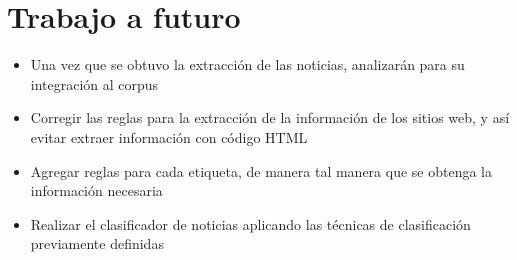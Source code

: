 
\section{Trabajo a futuro}
\begin{itemize}
  \item Una vez que se obtuvo la extracción de las noticias, analizarán para su integración al corpus
  \item Corregir las reglas para la extracción de la información de los sitios web, y así evitar extraer información con código HTML
  \item Agregar reglas para cada etiqueta, de manera tal manera que se obtenga la información necesaria
  \item Realizar el clasificador de noticias aplicando las técnicas de clasificación previamente definidas
\end{itemize}


